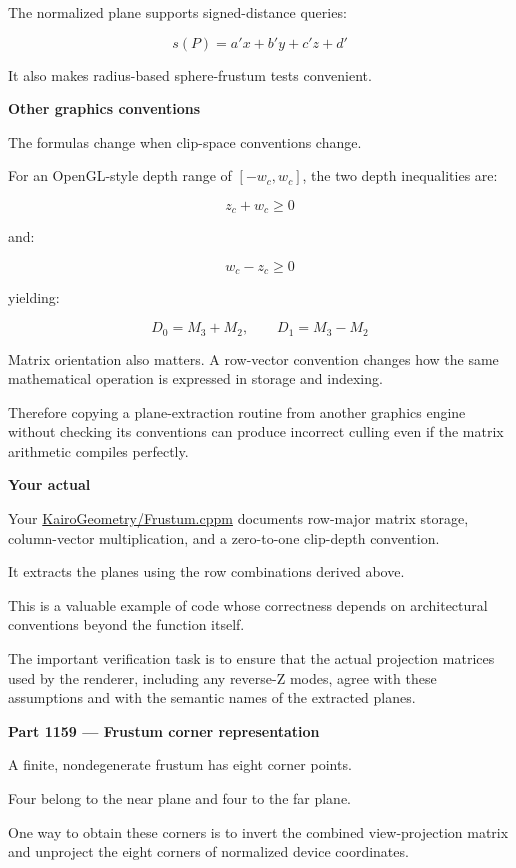 The normalized plane supports signed-distance queries:

\[
s(P)=a'x+b'y+c'z+d'
\]

It also makes radius-based sphere-frustum tests convenient.

\textbf{Other graphics conventions}

The formulas change when clip-space conventions change.

For an OpenGL-style depth range of \([-w_c,w_c]\), the two depth inequalities are:

\[
z_c+w_c\ge0
\]

and:

\[
w_c-z_c\ge0
\]

yielding:

\[
D_0=M_3+M_2,\qquad D_1=M_3-M_2
\]

Matrix orientation also matters. A row-vector convention changes how the same mathematical operation is expressed in storage and indexing.

Therefore copying a plane-extraction routine from another graphics engine without checking its conventions can produce incorrect culling even if the matrix arithmetic compiles perfectly.

\textbf{Your actual }

Your \href{https://github.com/swayam8624/KairoGeometry/blob/master/Frustum.cppm?utm_source=chatgpt.com}{KairoGeometry/Frustum.cppm} documents row-major matrix storage, column-vector multiplication, and a zero-to-one clip-depth convention.

It extracts the planes using the row combinations derived above.

This is a valuable example of code whose correctness depends on architectural conventions beyond the function itself.

The important verification task is to ensure that the actual projection matrices used by the renderer, including any reverse-Z modes, agree with these assumptions and with the semantic names of the extracted planes.

\textbf{Part 1159 --- Frustum corner representation}

A finite, nondegenerate frustum has eight corner points.

Four belong to the near plane and four to the far plane.

One way to obtain these corners is to invert the combined view-projection matrix and unproject the eight corners of normalized device coordinates.

